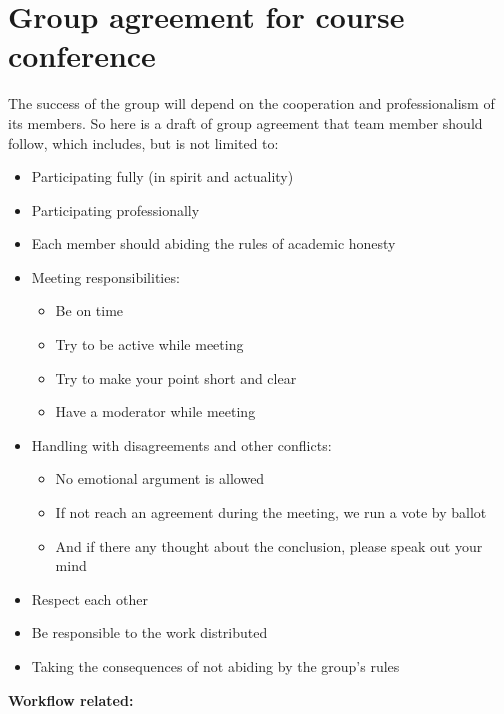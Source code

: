\newpage
\section{Group agreement for course conference}
The success of the group will depend on the cooperation and professionalism of its members. So here is a draft of group agreement that team member should follow, which includes, but is not limited to:
\begin{itemize}
    \item Participating fully (in spirit and actuality)
    \item Participating professionally
    \item Each member should abiding the rules of academic honesty
    \item Meeting responsibilities:
    \begin{itemize}
        \item Be on time
        \item Try to be active while meeting
        \item Try to make your point short and clear
        \item Have a moderator while meeting
    \end{itemize}
    \item Handling with disagreements and other conflicts:
     \begin{itemize}
        \item No emotional argument is allowed
        \item If not reach an agreement during the meeting, we run a vote by ballot 
        \item And if there any thought about the conclusion, please speak out your mind
    \end{itemize}
    \item Respect each other
    \item Be responsible to the work distributed
    \item Taking the consequences of not abiding by the group's rules
\end{itemize}
\newpage
\large \textbf{Workflow related:}
